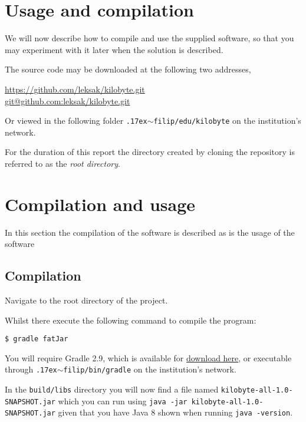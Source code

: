 \section{Usage and compilation}

We will now describe how to compile and use the supplied software, so
that you may experiment with it later when the solution is described.

The source code may be downloaded at the following two addresses,

\begin{center}
\url{https://github.com/leksak/kilobyte.git} \\
\url{git@github.com:leksak/kilobyte.git}
\end{center}

Or viewed in the following folder
\texttt{\raise.17ex\hbox{$\scriptstyle\mathtt{\sim}$}filip/edu/kilobyte}
on the institution's network.

For the duration of this report the directory created by cloning
the repository is referred to as the \emph{root directory}.

\section{Compilation and usage}

In this section the compilation of the software is described as
is the usage of the software

\subsection{Compilation}

Navigate to the root directory of the project.

Whilst there execute the following command to compile the program:

\begin{verbatim}
$ gradle fatJar
\end{verbatim}

You will require Gradle 2.9, which is available for
\href{http://gradle.org/gradle-download/}{download here}, or
executable through
\texttt{\raise.17ex\hbox{$\scriptstyle\mathtt{\sim}$}filip/bin/gradle}
on the institution's network.

In the \texttt{build/libs} directory you will now find a file named
\texttt{kilobyte-all-1.0-SNAPSHOT.jar} which you can run using \texttt{java -jar
  kilobyte-all-1.0-SNAPSHOT.jar} given that you have Java 8 shown when running
\texttt{java -version}.

